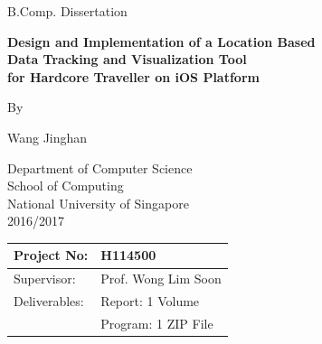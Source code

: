 \documentclass[12pt,a4paper]{article}
\begin{document}
	\begin{titlepage}
		\begin{center}
		
			B.Comp. Dissertation
			
			\vspace*{1.5cm}
			
			\fontsize{14pt}{14pt}\textbf {
			    Design and Implementation of a Location Based\\
                Data Tracking and Visualization Tool\\
                for Hardcore Traveller on iOS Platform\\
			}
			
			\vspace{2.5cm}
			
			By
			
			\vspace{0.5cm}
			
            Wang Jinghan
			
			
			\vspace{2.5cm}
			
			Department of Computer Science\\
			School of Computing\\
			National University of Singapore\\
			2016/2017
			
		\end{center}
		
		\vfill
		
		\centering
		\begin{tabular}{ || p{3cm} p{5cm} || }
		    \hline
            Project No:     &  H114500 \\
            \hline
            \hline
            Supervisor:     &  Prof. Wong Lim Soon   \\
            \hline
            \hline
            Deliverables:   & Report: 1 Volume     \\
                            & Program: 1 ZIP File   \\
                            \hline
        \end{tabular}
        
        \vspace{1cm}
			
	\end{titlepage}
	
\end{document}
